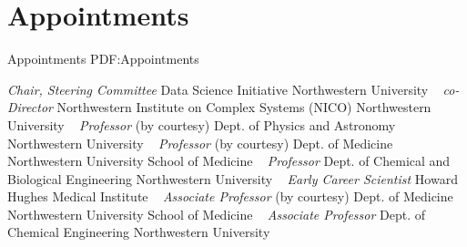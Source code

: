 \section
{Appointments}
{Appointments}
{PDF:Appointments}

\textit{Chair, Steering Committee} 
    \newline
    Data Science Initiative
\newline
Northwestern University
\newline
~
\Gap
{}
\textit{co-Director} 
    \newline
    Northwestern Institute on Complex Systems (NICO)
\newline
Northwestern University
\newline
~
\Gap
{}
\textit{Professor} (by courtesy)
    \newline
    Dept. of Physics and Astronomy
\newline
Northwestern University
\newline
~
\Gap
{}
\textit{Professor} (by courtesy)
    \newline
    Dept. of Medicine
\newline
Northwestern University School of Medicine
\newline
~
\Gap
{}
\textit{Professor} 
    \newline
    Dept. of Chemical and Biological Engineering
\newline
Northwestern University
\newline
~
\Gap
{}
\textit{Early Career Scientist} 
\newline
Howard Hughes Medical Institute
\newline
~
\Gap
{}
\textit{Associate Professor} (by courtesy)
    \newline
    Dept. of Medicine
\newline
Northwestern University School of Medicine
\newline
~
\Gap
{}
\textit{Associate Professor} 
    \newline
    Dept. of Chemical Engineering
\newline
Northwestern University
\newline
~
\Gap
{}
